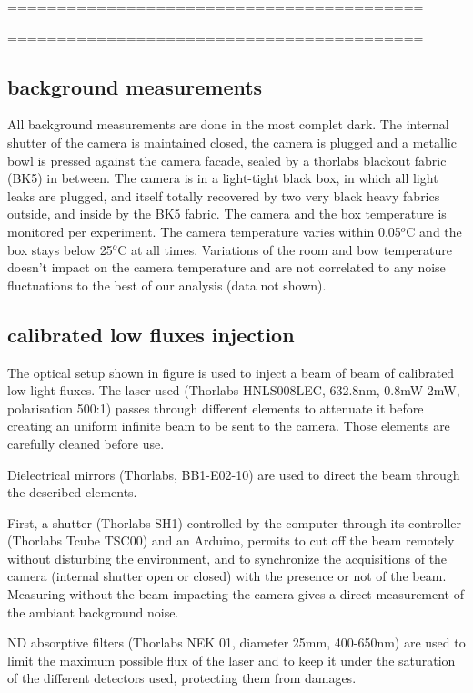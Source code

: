 \documentclass{article}
\begin{document}
==========================================

==========================================
\subsection{background measurements}

All background measurements are done in the most complet dark.
The internal shutter of the camera is maintained closed, the camera is plugged and a metallic bowl is pressed against the camera facade, sealed by a thorlabs blackout fabric (BK5) in between.
The camera is in a light-tight black box, in which all light leaks are plugged, and itself totally recovered by two very black heavy fabrics outside, and inside by the BK5 fabric.
The camera and the box temperature is monitored per experiment. 
The camera temperature varies within 0.05$^o$C and the box stays below 25$^o$C at all times. Variations of the room and bow temperature doesn't impact on the camera temperature and are not correlated to any noise fluctuations to the best of our analysis (data not shown).


\subsection{calibrated low fluxes injection}

The optical setup shown in figure  is used to inject a beam of beam of calibrated low light fluxes.
The laser used (Thorlabs HNLS008LEC, 632.8nm, 0.8mW-2mW, polarisation 500:1) passes through different elements to attenuate it before  creating an uniform infinite beam to be sent to the camera.
Those elements are carefully cleaned before use.

Dielectrical mirrors (Thorlabs, BB1-E02-10) are used  to direct the beam through the described elements.

First, a shutter (Thorlabs SH1) controlled by the computer through  its controller (Thorlabs Tcube TSC00) and an Arduino, permits to cut off the beam remotely without disturbing the environment,  and to synchronize the acquisitions of the camera (internal shutter open or closed) with the presence or not of the beam. Measuring without the beam impacting the camera gives a direct measurement of the ambiant background noise.

ND absorptive filters (Thorlabs NEK 01, diameter 25mm, 400-650nm) are used to limit the maximum possible flux of the laser and to keep it under the saturation of the different detectors used, protecting them from damages.
\end{document}

